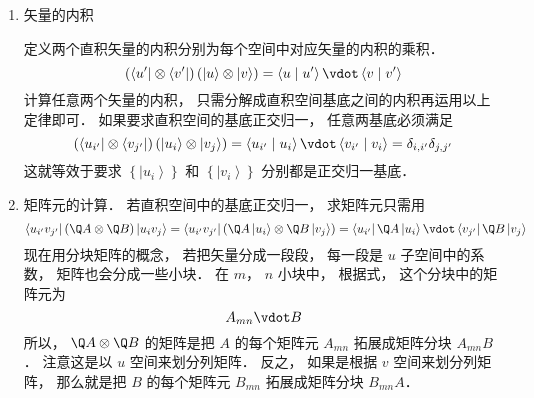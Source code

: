 \begin{enumerate}
\item 矢量的内积

定义两个直积矢量的内积分别为每个空间中对应矢量的内积的乘积．
 \begin{equation}
 \left( {\left\langle {u'} \right| \otimes \left\langle {v'} \right|} \right)\left( {\left| u \right\rangle  \otimes \left| v \right\rangle } \right) = \left\langle {u}
 \mathrel{\left | {\vphantom {u {u'}}}
 \right. \kern-\nulldelimiterspace}
 {{u'}} \right\rangle  \vdot \left\langle {v}
 \mathrel{\left | {\vphantom {v {v'}}}
 \right. \kern-\nulldelimiterspace}
 {{v'}} \right\rangle 
\end{equation}
计算任意两个矢量的内积， 只需分解成直积空间基底之间的内积再运用以上定律即可． 如果要求直积空间的基底正交归一， 任意两基底必须满足
 \begin{equation}
 \left( {\left\langle {{u_{i'}}} \right| \otimes \left\langle {{v_{j'}}} \right|} \right)\left( {\left| {{u_i}} \right\rangle  \otimes \left| {{v_j}} \right\rangle } \right) = \left\langle {{{u_{i'}}}}
 \mathrel{\left | {\vphantom {{{u_{i'}}} {{u_i}}}}
 \right. \kern-\nulldelimiterspace}
 {{{u_i}}} \right\rangle  \vdot \left\langle {{{v_{i'}}}}
 \mathrel{\left | {\vphantom {{{v_{i'}}} {{v_i}}}}
 \right. \kern-\nulldelimiterspace}
 {{{v_i}}} \right\rangle  = {\delta _{i,i'}}{\delta _{j,j'}}
\end{equation}
这就等效于要求 $\left\{ {\left| {{u_i}} \right\rangle } \right\}$ 和 $\left\{ {\left| {{v_i}} \right\rangle } \right\}$  分别都是正交归一基底．

\item 矩阵元的计算． 若直积空间中的基底正交归一， 求矩阵元只需用
 \begin{equation}
 \left\langle {{u_{i'}}{v_{j'}}} \right|\left( {\Q A \otimes \Q B} \right)\left| {{u_i}{v_j}} \right\rangle  = \left\langle {{u_{i'}}{v_{j'}}} \right|\left( {\Q A\left| {{u_i}} \right\rangle  \otimes \Q B\left| {{v_j}} \right\rangle } \right) = \left\langle {{u_{i'}}} \right|\Q A\left| {{u_i}} \right\rangle  \vdot \left\langle {{v_{j'}}} \right|\Q B\left| {{v_j}} \right\rangle 
\end{equation}
现在用分块矩阵的概念， 若把矢量分成一段段， 每一段是 $u$ 子空间中的系数， 矩阵也会分成一些小块． 在 $m$，  $n$ 小块中， 根据式， 这个分块中的矩阵元为
 \begin{equation}
  {A_{mn}} \vdot B
\end{equation}
所以，  $\Q A \otimes \Q B$ 的矩阵是把 $A$ 的每个矩阵元 ${A_{mn}}$ 拓展成矩阵分块 ${A_{mn}}B$．  注意这是以 $u$ 空间来划分列矩阵． 反之， 如果是根据 $v$ 空间来划分列矩阵， 那么就是把 $B$ 的每个矩阵元 ${B_{mn}}$ 拓展成矩阵分块 ${B_{mn}}A$． 
\end{enumerate}

